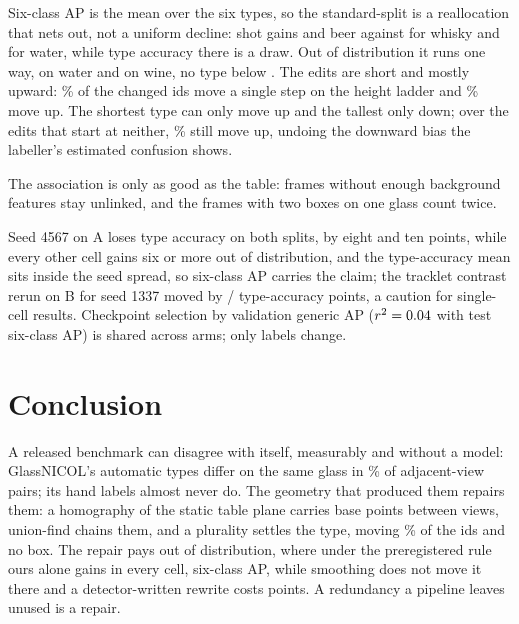 \documentclass{article}
\begin{document}
Six-class AP is the mean over the six types, so the standard-split \SvSixStdVsRawGain{} is a reallocation that nets out, not a uniform decline: shot gains \ClsStdShot{} and beer \ClsStdBeer{} against \ClsStdWhisky{} for whisky and \ClsStdWater{} for water, while type accuracy there is a draw. Out of distribution it runs one way, \ClsOODWater{} on water and \ClsOODWine{} on wine, no type below \ClsOODShot. The edits are short and mostly upward: \VoteOneStepPct\% of the \VoteChangedBoxes{} changed ids move a single step on the height ladder and \VoteUpPct\% move up. The shortest type can only move up and the tallest only down; over the \VoteInnerEdits{} edits that start at neither, \VoteInnerUpPct\% still move up, undoing the downward bias the labeller's estimated confusion shows.

The association is only as good as the table: frames without enough background features stay unlinked, and the \DupFrames{} frames with two boxes on one glass count twice.

Seed 4567 on A loses type accuracy on both splits, by eight and ten points, while every other cell gains six or more out of distribution, and the type-accuracy mean sits inside the seed spread, so six-class AP carries the claim; the tracklet contrast rerun on B for seed 1337 moved by \XHostTypeStd/\XHostTypeOOD{} type-accuracy points, a caution for single-cell results. Checkpoint selection by validation generic AP ($r^2=0.04$ with test six-class AP) is shared across arms; only labels change.

\section{Conclusion}
A released benchmark can disagree with itself, measurably and without a model: GlassNICOL's automatic types differ on the same glass in \FlipRateReg\% of adjacent-view pairs; its hand labels almost never do. The geometry that produced them repairs them: a homography of the static table plane carries base points between views, union-find chains them, and a plurality settles the type, moving \SceneChangedPct\% of the ids and no box. The repair pays out of distribution, where under the preregistered rule ours alone gains in every cell, \SvSixOODVsRawGain{} six-class AP, while smoothing does not move it there and a detector-written rewrite costs \BaseCfOODDrop{} points. A redundancy a pipeline leaves unused is a repair.



\end{document}
